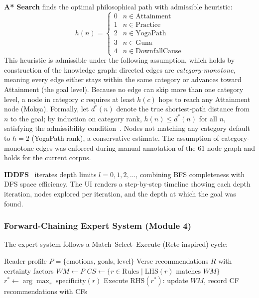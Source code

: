 \documentclass[conference]{IEEEtran}
\begin{document}
\textbf{A* Search} finds the optimal philosophical path with admissible
heuristic:
\begin{equation}
  h(n) = \begin{cases}
    0 & n \in \text{Attainment} \\
    1 & n \in \text{Practice} \\
    2 & n \in \text{YogaPath} \\
    3 & n \in \text{Guna} \\
    4 & n \in \text{DownfallCause}
  \end{cases}
  \label{eq:heuristic}
\end{equation}
This heuristic is admissible under the following assumption, which holds
by construction of the knowledge graph: directed edges are
\textit{category-monotone}, meaning every edge either stays within the same
category or advances toward Attainment (the goal level). Because no edge
can skip more than one category level, a node in category $c$ requires at
least $h(c)$ hops to reach any Attainment node (Mok\d{s}a). Formally, let
$d^*(n)$ denote the true shortest-path distance from $n$ to the goal; by
induction on category rank, $h(n) \leq d^*(n)$ for all $n$, satisfying
the admissibility condition~\cite{hart1968formal}. Nodes not matching any
category default to $h = 2$ (YogaPath rank), a conservative estimate. The
assumption of category-monotone edges was enforced during manual annotation
of the 61-node graph and holds for the current corpus.

\textbf{IDDFS}~\cite{korf1985depth} iterates depth limits $l = 0, 1, 2,\ldots$,
combining BFS completeness with DFS space efficiency. The UI renders a
step-by-step timeline showing each depth iteration, nodes explored per
iteration, and the depth at which the goal was found.

\subsubsection{Forward-Chaining Expert System (Module 4)}

The expert system follows a Match--Select--Execute (Rete-inspired) cycle:

\begin{algorithm}[htbp]
\caption{Forward-Chaining Expert System Inference}
\label{alg:expert}
\begin{algorithmic}
\REQUIRE Reader profile $P = \{$emotions, goals, level$\}$
\ENSURE Verse recommendations $R$ with certainty factors
\STATE $WM \leftarrow P$
\REPEAT
  \STATE $CS \leftarrow \{r \in \text{Rules} \mid \text{LHS}(r) \text{ matches } WM\}$
    \STATE $r^* \leftarrow \arg\max_r\;\text{specificity}(r)$
    \STATE Execute RHS$(r^*)$: update $WM$, record CF
  \ENDIF
{}
\RETURN recommendations with CFs
\end{algorithmic}
\end{algorithm}
\end{document}
